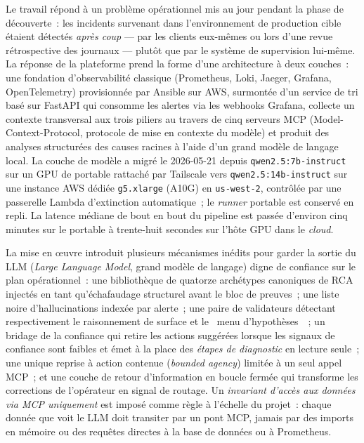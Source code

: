 \documentclass[11pt,a4paper,oneside]{report}
\begin{document}
Le travail répond à un problème opérationnel mis au jour pendant la
phase de découverte~: les incidents survenant dans l'environnement de
production cible étaient détectés \emph{après coup} --- par les
clients eux-mêmes ou lors d'une revue rétrospective des journaux ---
plutôt que par le système de supervision lui-même. La réponse de la
plateforme prend la forme d'une architecture à deux couches~: une
fondation d'observabilité classique (Prometheus, Loki, Jaeger,
Grafana, OpenTelemetry) provisionnée par Ansible sur AWS, surmontée
d'un service de tri basé sur FastAPI qui consomme les alertes via les
webhooks Grafana, collecte un contexte transversal aux trois piliers
au travers de cinq serveurs MCP (Model-Context-Protocol, protocole de
mise en contexte du modèle) et produit des analyses structurées des
causes racines à l'aide d'un grand modèle de langage local. La couche
de modèle a migré le 2026-05-21 depuis \texttt{qwen2.5:7b-instruct}
sur un GPU de portable rattaché par Tailscale vers
\texttt{qwen2.5:14b-instruct} sur une instance AWS dédiée
\texttt{g5.xlarge} (A10G) en \texttt{us-west-2}, contrôlée par une
passerelle Lambda d'extinction automatique~; le \emph{runner}
portable est conservé en repli. La latence médiane de bout en bout du
pipeline est passée d'environ cinq minutes sur le portable à
trente-huit secondes sur l'hôte GPU dans le \emph{cloud}.

La mise en \oe{}uvre introduit plusieurs mécanismes inédits pour
garder la sortie du LLM (\emph{Large Language Model}, grand modèle de
langage) digne de confiance sur le plan opérationnel~: une
bibliothèque de quatorze archétypes canoniques de RCA injectés en
tant qu'échafaudage structurel avant le bloc de preuves~; une liste
noire d'hallucinations indexée par alerte~; une paire de validateurs
détectant respectivement le raisonnement de surface et le
\og~menu d'hypothèses~\fg{}~; un bridage de la confiance qui retire
les actions suggérées lorsque les signaux de confiance sont faibles
et émet à la place des \emph{étapes de diagnostic} en lecture seule~;
une unique reprise à action contenue (\emph{bounded agency}) limitée
à un seul appel MCP~; et une couche de retour d'information en
boucle fermée qui transforme les corrections de l'opérateur en
signal de routage. Un \emph{invariant d'accès aux données via MCP
uniquement} est imposé comme règle à l'échelle du projet~: chaque
donnée que voit le LLM doit transiter par un pont MCP, jamais par
des imports en mémoire ou des requêtes directes à la base de données
ou à Prometheus.
\end{document}
